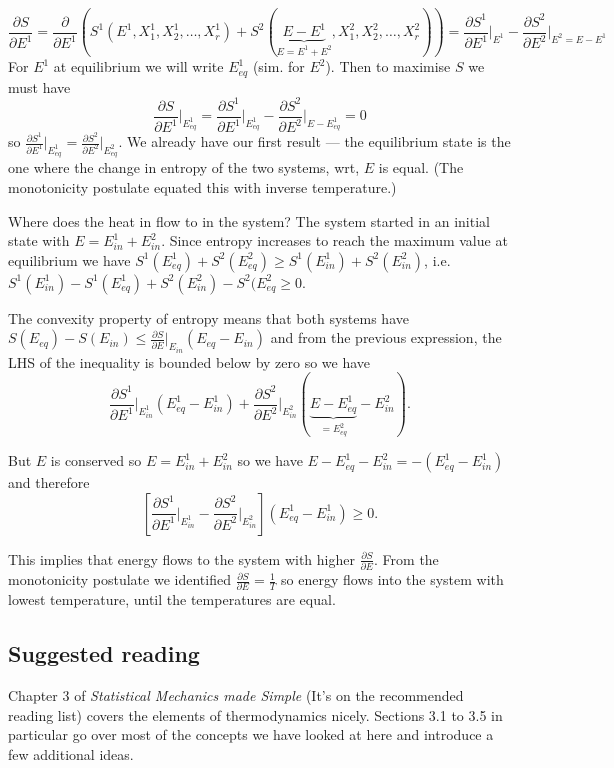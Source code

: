 \documentclass{article}
\begin{document}
$$\frac{\partial S}{\partial E^1} = \frac{\partial}{\partial E^1}\left(S^1(E^1,X_1^1,X_2^1,\ldots,X_r^1) + S^2(\underbrace{E-E^1}_{E=E^1+E^2},X_1^2,X_2^2,\ldots,X_r^2) \right) = \frac{\partial S^1}{\partial E^1}\bigg\vert_{E^1} -  \frac{\partial S^2}{\partial E^2}\bigg\vert_{E^2=E-E^1}$$
For $E^1$ at equilibrium we will write $E^1_{eq}$ (sim. for $E^2$). Then to maximise $S$ we must have
$$\frac{\partial S}{\partial E^1}\bigg\vert_{E^1_{eq}} = \frac{\partial S^1}{\partial E^1}\bigg\vert_{E^1_{eq}} - \frac{\partial S^2}{\partial E^2}\bigg\vert_{E-E^1_{eq}}=0$$
so $\frac{\partial S^1}{\partial E^1}\vert_{E^1_{eq}} = \frac{\partial S^2}{\partial E^2}\vert_{E_{eq}^2}$. We already have our first result --- the equilibrium state is the one where the change in entropy of the two systems, wrt, $E$ is equal. (The  monotonicity postulate equated this with inverse temperature.)

Where does the heat in flow to in the system? The system started in an initial state with $E = E^1_{in}+E^2_{in}$. Since entropy increases to reach the maximum  value at equilibrium we have $S^1(E^1_{eq}) + S^2(E^2_{eq}) \geq S^1(E^1_{in}) + S^2(E^2_{in})$, i.e. $ S^1(E^1_{in}) - S^1(E^1_{eq})  +  S^2(E^2_{in}) - S^2(E^2_{eq}\geq 0$.

The convexity property of entropy means that both systems have $S(E_{eq})-S(E_{in})\leq \frac{\partial S}{\partial E}\vert_{E_{in}}(E_{eq}-E_{in})$ and from the previous expression, the LHS of the inequality is bounded below by zero so we have
$$\frac{\partial S^1}{\partial E^1}\bigg\vert_{E^1_{in}}(E_{eq}^1-E_{in}^1) + \frac{\partial S^2}{\partial E^2}\bigg\vert_{E^2_{in}}(\underbrace{E-E_{eq}^1}_{=E^2_{eq}}-E_{in}^2).$$

But $E$ is conserved so $E=E^1_{in}+E^2_{in}$ so we have $E-E^1_{eq}-E^2_{in} = -(E^1_{eq}-E^1_{in})$ and therefore
$$\left[\frac{\partial S^1}{\partial E^1}\bigg\vert_{E^1_{in}} - \frac{\partial S^2}{\partial E^2}\bigg\vert_{E^2_{in}}\right]\left(E^1_{eq}-E^1_{in}\right)\geq 0.$$

This implies that energy flows to the  system with higher $\frac{\partial S}{\partial E}$. From the monotonicity postulate we identified  $\frac{\partial S}{\partial E}= \frac{1}{T}$ so energy flows into the system with lowest temperature, until the temperatures are equal.

\subsection*{Suggested reading}
Chapter 3 of \emph{Statistical Mechanics made Simple} (It's on the recommended reading list) covers the elements of thermodynamics nicely. Sections 3.1 to 3.5 in particular go over most of the concepts we have looked at here and introduce a few additional ideas.
\end{document}

